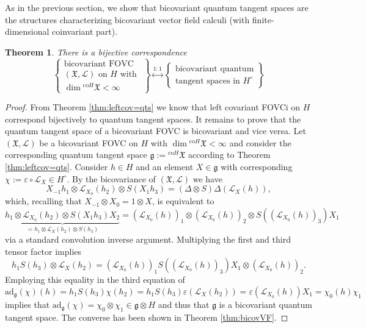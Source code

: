 \documentclass{article}
\newtheorem{theorem}[thm]{Theorem}
\theoremstyle{definition}
\begin{document}
	As in the previous section, we show that bicovariant quantum tangent spaces are the structures characterizing bicovariant vector field calculi (with finite-dimensional coinvariant part).
	\begin{theorem}
		There is a bijective correspondence
		\begin{equation}
			\begin{Bmatrix}
				\text{bicovariant FOVC}\\
				(\mathfrak{X},\mathscr{L})\text{ on $H$ with }\\
				\dim{}^{\mathrm{co}H}\mathfrak{X}<\infty
			\end{Bmatrix}\overset{1:1}{\longleftrightarrow}\begin{Bmatrix}
				\text{bicovariant quantum}\\
				\text{tangent spaces in }H^\circ
			\end{Bmatrix}
		\end{equation}
	\end{theorem}
	\begin{proof}
		From Theorem \ref{thm:leftcov=qts} we know that left covariant FOVCi on $H$ correspond bijectively to quantum tangent spaces. It remains to prove that the quantum tangent space of a bicovariant FOVC is bicovariant and vice versa.
		Let $(\mathfrak{X},\mathscr{L})$ be a bicovariant FOVC on $H$ with $\dim{}^{\mathrm{co}H}\mathfrak{X}<\infty$ and consider the corresponding quantum tangent space $\mathfrak{g}:={}^{\mathrm{co}H}\mathfrak{X}$ according to Theorem \ref{thm:leftcov=qts}. Consider $h\in H$ and an element $X\in\mathfrak{g}$ with corresponding $\chi:=\varepsilon\circ\mathscr{L}_X\in H^\circ$. By the bicovariance of $(\mathfrak{X},\mathscr{L})$ we have
		$$
		X_{-1}h_1\otimes\mathscr{L}_{X_0}(h_2)\otimes S(X_1h_3)
		=(\Delta\otimes S)\Delta(\mathscr{L}_X(h)),
		$$
		which, recalling that $X_{-1}\otimes X_0=1\otimes X$, is equivalent to
		$$
		\underbrace{h_1\otimes\mathscr{L}_{X_0}(h_2)\otimes S(X_1h_3)X_2}_{=h_1\otimes\mathscr{L}_X(h_2)\otimes S(h_3)}
		=(\mathscr{L}_{X_0}(h))_1\otimes(\mathscr{L}_{X_0}(h))_2\otimes S((\mathscr{L}_{X_0}(h))_3)X_1
		$$
		via a standard convolution inverse argument. Multiplying the first and third tensor factor implies
		$$
		h_1S(h_3)\otimes\mathscr{L}_X(h_2)
		=(\mathscr{L}_{X_0}(h))_1S((\mathscr{L}_{X_0}(h))_3)X_1\otimes(\mathscr{L}_{X_0}(h))_2.
		$$
		Employing this equality in the third equation of
		$$
		\mathrm{ad}_\mathfrak{g}(\chi)(h)
		=h_1S(h_3)\chi(h_2)
		=h_1S(h_3)\varepsilon(\mathscr{L}_X(h_2))
		=\varepsilon(\mathscr{L}_{X_0}(h))X_1
		=\chi_0(h)\chi_1
		$$
		implies that $\mathrm{ad}_\mathfrak{g}(\chi)=\chi_0\otimes \chi_1\in\mathfrak{g}\otimes H$ and thus that $\mathfrak{g}$ is a bicovariant quantum tangent space.
		The converse has been shown in Theorem \ref{thm:bicovVF}.
	\end{proof}
	
\end{document}
